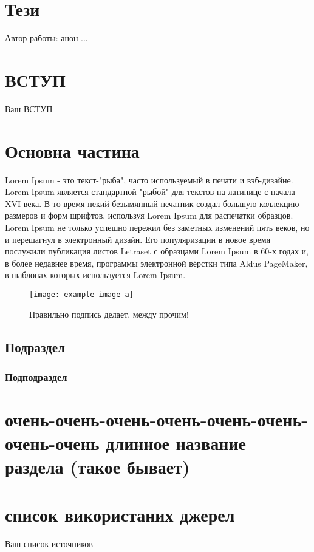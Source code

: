\documentclass[a4paper, 14pt]{article}
\let\stdsection\section
\renewcommand\section{\newpage\stdsection}
\begin{document}
\section*{Т\lowercase{ези}}
Автор работы: анон
...
\newpage

\renewcommand{\contentsname}{\normalsize \normalfont ЗМІСТ} %

\tableofcontents %

\newpage
{} %
\section*{\textbf{ВСТУП}}
Ваш ВСТУП
\newpage %
\section{Основна частина}
Lorem Ipsum - это текст-"рыба", часто используемый в печати и вэб-дизайне. Lorem Ipsum является стандартной "рыбой" для текстов на латинице с начала XVI века. В то время некий безымянный печатник создал большую коллекцию размеров и форм шрифтов, используя Lorem Ipsum для распечатки образцов. Lorem Ipsum не только успешно пережил без заметных изменений пять веков, но и перешагнул в электронный дизайн. Его популяризации в новое время послужили публикация листов Letraset с образцами Lorem Ipsum в 60-х годах и, в более недавнее время, программы электронной вёрстки типа Aldus PageMaker, в шаблонах которых используется Lorem Ipsum.
\begin{figure}[h]
    \centering
    \texttt{[image: example-image-a]}
    \caption{Правильно подпись делает, между прочим!}
    \label{fig:mesh1}
\end{figure}
 
\subsection{Подраздел}
\subsubsection{Подподраздел}
\section{очень-очень-очень-очень-очень-очень-очень-очень длинное название раздела (такое бывает)}
\section*{список використаних джерел}
Ваш список источников
\end{document}
